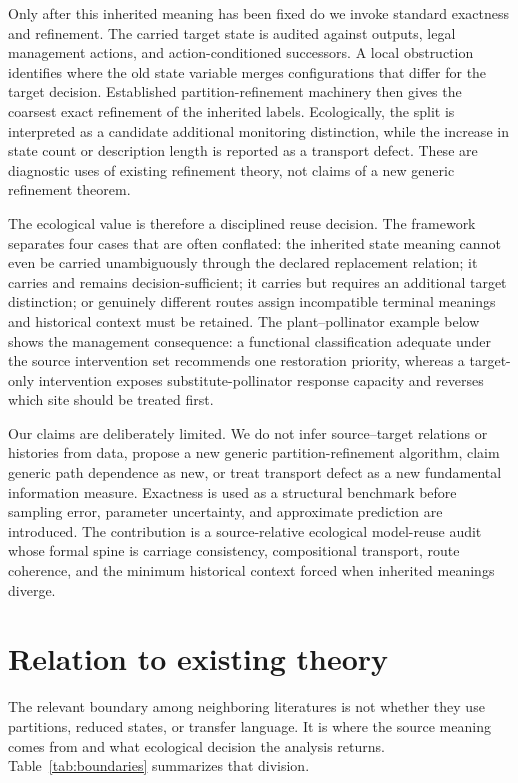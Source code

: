 \documentclass[11pt]{article}
\begin{document}
Only after this inherited meaning has been fixed do we invoke standard exactness and refinement. The carried target state is audited against outputs, legal management actions, and action-conditioned successors. A local obstruction identifies where the old state variable merges configurations that differ for the target decision. Established partition-refinement machinery then gives the coarsest exact refinement of the inherited labels. Ecologically, the split is interpreted as a candidate additional monitoring distinction, while the increase in state count or description length is reported as a transport defect. These are diagnostic uses of existing refinement theory, not claims of a new generic refinement theorem.

The ecological value is therefore a disciplined reuse decision. The framework separates four cases that are often conflated: the inherited state meaning cannot even be carried unambiguously through the declared replacement relation; it carries and remains decision-sufficient; it carries but requires an additional target distinction; or genuinely different routes assign incompatible terminal meanings and historical context must be retained. The plant--pollinator example below shows the management consequence: a functional classification adequate under the source intervention set recommends one restoration priority, whereas a target-only intervention exposes substitute-pollinator response capacity and reverses which site should be treated first.

Our claims are deliberately limited. We do not infer source--target relations or histories from data, propose a new generic partition-refinement algorithm, claim generic path dependence as new, or treat transport defect as a new fundamental information measure. Exactness is used as a structural benchmark before sampling error, parameter uncertainty, and approximate prediction are introduced. The contribution is a source-relative ecological model-reuse audit whose formal spine is carriage consistency, compositional transport, route coherence, and the minimum historical context forced when inherited meanings diverge.

\section{Relation to existing theory}
The relevant boundary among neighboring literatures is not whether they use partitions, reduced states, or transfer language. It is where the source meaning comes from and what ecological decision the analysis returns. Table~\ref{tab:boundaries} summarizes that division.
\end{document}

